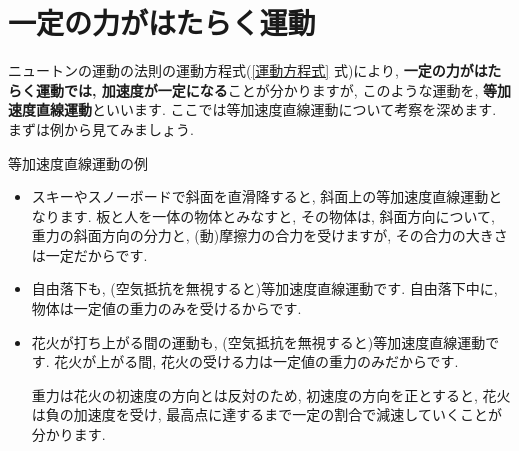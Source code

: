 \documentclass[11pt,dvipdfmx]{jsarticle}
\numberwithin{equation}{section} %
\begin{document}
\section{一定の力がはたらく運動}\label{一定の力がはたらく運動}
ニュートンの運動の法則の運動方程式(\eqref{運動方程式} 式)により, \textbf{一定の力がはたらく運動では, 加速度が一定になる}ことが分かりますが, このような運動を, \textbf{等加速度直線運動}といいます. ここでは等加速度直線運動について考察を深めます. まずは例から見てみましょう.
\begin{exbox}{等加速度直線運動の例}
    \begin{itemize}
        \item スキーやスノーボードで斜面を直滑降すると, 斜面上の等加速度直線運動となります. 板と人を一体の物体とみなすと, その物体は, 斜面方向について, 重力の斜面方向の分力と, (動)摩擦力の合力を受けますが, その合力の大きさは一定だからです. 
        \begin{center}
        \end{center}
        \item 自由落下も, (空気抵抗を無視すると)等加速度直線運動です. 自由落下中に, 物体は一定値の重力のみを受けるからです.
        \item 花火が打ち上がる間の運動も, (空気抵抗を無視すると)等加速度直線運動です. 花火が上がる間, 花火の受ける力は一定値の重力のみだからです. 
        
        重力は花火の初速度の方向とは反対のため, 初速度の方向を正とすると, 花火は負の加速度を受け, 最高点に達するまで一定の割合で減速していくことが分かります. 
    \end{itemize}
\end{exbox}
\end{document}
